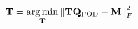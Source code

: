 \documentclass[preview]{standalone}
\begin{document}
\begin{align*}
\special{dvisvgm:raw <g id='unique000'>}\mathbf T=\underset{\mathbf T}{\operatorname*{arg\,min}}\left\|\mathbf T\mathbf Q_{\rm POD}-\mathbf M\right\|_F^2\special{dvisvgm:raw </g>}
\end{align*}
\end{document}
